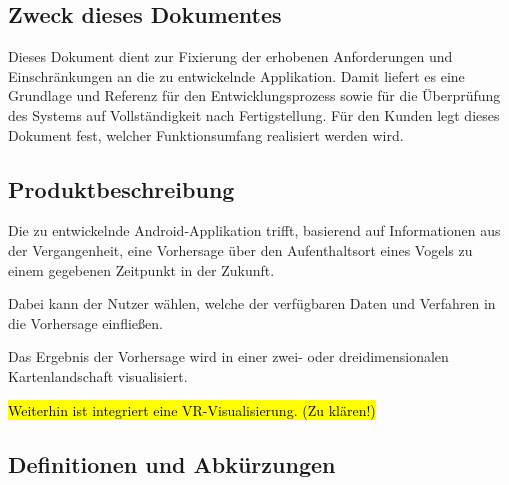 \documentclass[12pt]{article} %
\begin{document}
\subsection{Zweck dieses Dokumentes}



 Dieses Dokument dient  zur Fixierung der erhobenen Anforderungen und Einschränkungen an die zu entwickelnde Applikation. Damit liefert es eine Grundlage und Referenz für den Entwicklungsprozess sowie für die Überprüfung des Systems auf Vollständigkeit nach Fertigstellung. Für den Kunden legt dieses Dokument fest, welcher Funktionsumfang realisiert werden wird.


\subsection{Produktbeschreibung}

Die zu entwickelnde Android-Applikation trifft, basierend auf Informationen aus der Vergangenheit, eine Vorhersage über den Aufenthaltsort eines Vogels zu einem gegebenen Zeitpunkt in der Zukunft. 

Dabei kann der Nutzer wählen, welche der verfügbaren Daten und Verfahren in die Vorhersage einfließen. 

Das Ergebnis der Vorhersage wird in einer zwei- oder dreidimensionalen Kartenlandschaft visualisiert.

\hl{Weiterhin ist integriert eine VR-Visualisierung. (Zu klären!)}


\subsection{Definitionen und Abkürzungen}



 
\end{document}
